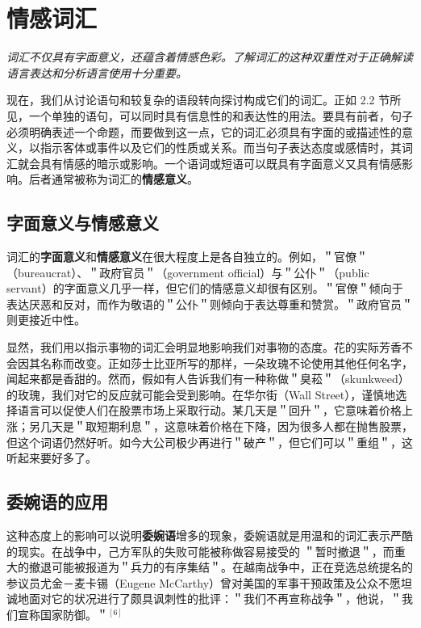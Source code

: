 \section{情感词汇}

\begin{logicbox}[title=引言]
\textit{词汇不仅具有字面意义，还蕴含着情感色彩。了解词汇的这种双重性对于正确解读语言表达和分析语言使用十分重要。}
\end{logicbox}

现在，我们从讨论语句和较复杂的语段转向探讨构成它们的词汇。正如 2.2 节所见，一个单独的语句，可以同时具有信息性的和表达性的用法。要具有前者，句子必须明确表述一个命题，而要做到这一点，它的词汇必须具有字面的或描述性的意义，以指示客体或事件以及它们的性质或关系。而当句子表达态度或感情时，其词汇就会具有情感的暗示或影响。一个语词或短语可以既具有字面意义又具有情感影响。后者通常被称为词汇的\textbf{情感意义}。

\subsection{字面意义与情感意义}

词汇的\textbf{字面意义}和\textbf{情感意义}在很大程度上是各自独立的。例如，＂官僚＂（bureaucrat）、＂政府官员＂（government official）与＂公仆＂（public servant）的字面意义几乎一样，但它们的情感意义却很有区别。＂官僚＂倾向于表达厌恶和反对，而作为敬语的＂公仆＂则倾向于表达尊重和赞赏。＂政府官员＂则更接近中性。

显然，我们用以指示事物的词汇会明显地影响我们对事物的态度。花的实际芳香不会因其名称而改变。正如莎士比亚所写的那样，一朵玫瑰不论使用其他任何名字，闻起来都是香甜的。然而，假如有人告诉我们有一种称做＂臭菘＂（skunkweed）的玫瑰，我们对它的反应就可能会受到影响。在华尔街（Wall Street），谨慎地选择语言可以促使人们在股票市场上采取行动。某几天是＂回升＂，它意味着价格上涨；另几天是＂取短期利息＂，这意味着价格在下降，因为很多人都在抛售股票，但这个词语仍然好听。如今大公司极少再进行＂破产＂，但它们可以＂重组＂，这听起来要好多了。

\subsection{委婉语的应用}

这种态度上的影响可以说明\textbf{委婉语}增多的现象，委婉语就是用温和的词汇表示严酷的现实。在战争中，己方军队的失败可能被称做容易接受的 ＂暂时撤退＂，而重大的撤退可能被报道为＂兵力的有序集结＂。在越南战争中，正在竞选总统提名的参议员尤金－麦卡锡（Eugene McCarthy）曾对美国的军事干预政策及公众不愿坦诚地面对它的状况进行了颇具讽刺性的批评：＂我们不再宣称战争＂，他说，＂我们宣称国家防御。＂$^{[6]}$

